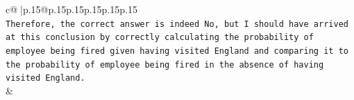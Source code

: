\documentclass{article}
\begin{document}
{\begin{supertabular}{c@{$\;$}|p{.15\linewidth}@{}p{.15\linewidth}p{.15\linewidth}p{.15\linewidth}p{.15\linewidth}p{.15\linewidth}}
{{{\\ 
\texttt{Therefore, the correct answer is indeed No, but I should have arrived at this conclusion by correctly calculating the probability of employee being fired given having visited England and comparing it to the probability of employee being fired in the absence of having visited England.} \\
            }
        }
    }
    & \\ \\

\end{supertabular}
}
\end{document}
